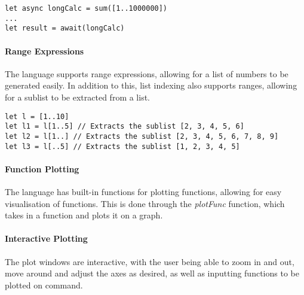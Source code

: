 \begin{verbatim}
let async longCalc = sum([1..1000000])
...
let result = await(longCalc)
\end{verbatim}

\paragraph{Range Expressions} The language supports range expressions, allowing for a list of numbers to be
generated easily.
In addition to this, list indexing also supports ranges, allowing for a sublist to be extracted from a list.

\begin{verbatim}
let l = [1..10]
let l1 = l[1..5] // Extracts the sublist [2, 3, 4, 5, 6]
let l2 = l[1..] // Extracts the sublist [2, 3, 4, 5, 6, 7, 8, 9]
let l3 = l[..5] // Extracts the sublist [1, 2, 3, 4, 5]
\end{verbatim}

\paragraph{Function Plotting} The language has built-in functions for plotting functions, allowing for easy
visualisation of functions.
This is done through the \textit{plotFunc} function, which takes in a function and plots it on a graph.

\paragraph{Interactive Plotting} The plot windows are interactive, with the user being able to zoom in and out,
move around and adjust the axes as desired, as well as inputting functions to be plotted on command.